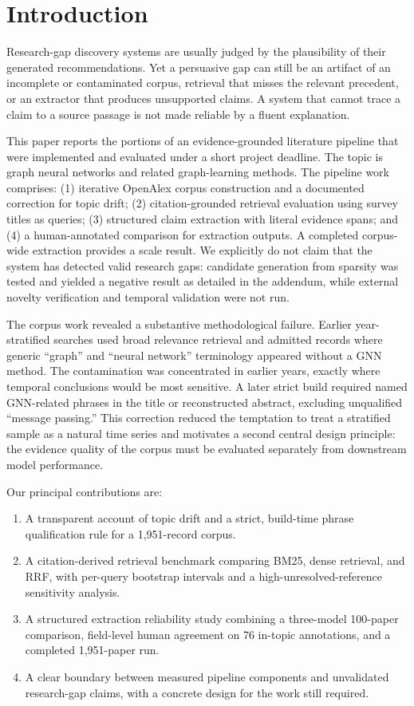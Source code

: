 \documentclass[sigconf,review,anonymous]{acmart}
\begin{document}
\section{Introduction}
Research-gap discovery systems are usually judged by the plausibility of their generated recommendations. Yet a persuasive gap can still be an artifact of an incomplete or contaminated corpus, retrieval that misses the relevant precedent, or an extractor that produces unsupported claims. A system that cannot trace a claim to a source passage is not made reliable by a fluent explanation.

This paper reports the portions of an evidence-grounded literature pipeline that were implemented and evaluated under a short project deadline. The topic is graph neural networks and related graph-learning methods. The pipeline work comprises: (1) iterative OpenAlex corpus construction and a documented correction for topic drift; (2) citation-grounded retrieval evaluation using survey titles as queries; (3) structured claim extraction with literal evidence spans; and (4) a human-annotated comparison for extraction outputs. A completed corpus-wide extraction provides a scale result. We explicitly do not claim that the system has detected valid research gaps: candidate generation from sparsity was tested and yielded a negative result as detailed in the addendum, while external novelty verification and temporal validation were not run.

The corpus work revealed a substantive methodological failure. Earlier year-stratified searches used broad relevance retrieval and admitted records where generic “graph” and “neural network” terminology appeared without a GNN method. The contamination was concentrated in earlier years, exactly where temporal conclusions would be most sensitive. A later strict build required named GNN-related phrases in the title or reconstructed abstract, excluding unqualified “message passing.” This correction reduced the temptation to treat a stratified sample as a natural time series and motivates a second central design principle: the evidence quality of the corpus must be evaluated separately from downstream model performance.

Our principal contributions are:

\begin{enumerate}
\item A transparent account of topic drift and a strict, build-time phrase qualification rule for a 1,951-record corpus.
\item A citation-derived retrieval benchmark comparing BM25, dense retrieval, and RRF, with per-query bootstrap intervals and a high-unresolved-reference sensitivity analysis.
\item A structured extraction reliability study combining a three-model 100-paper comparison, field-level human agreement on 76 in-topic annotations, and a completed 1,951-paper run.
\item A clear boundary between measured pipeline components and unvalidated research-gap claims, with a concrete design for the work still required.
\end{enumerate}
\end{document}
